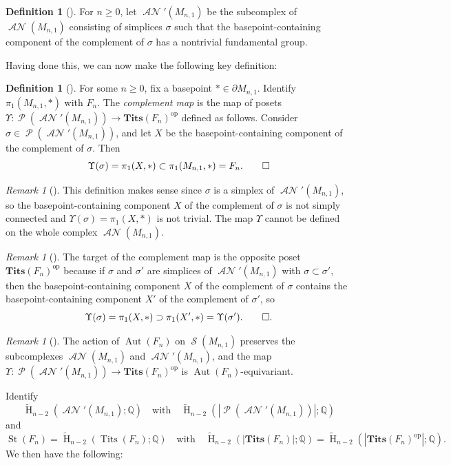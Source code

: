 \documentclass[11pt]{amsart}
\numberwithin{equation}{section}
\theoremstyle{plain}
\theoremstyle{definition}
\newtheorem{defn}[theorem]{Definition}
\newenvironment{definition}[1][]{\begin{defn}[#1]\pushQED{\qed}}{\popQED \end{defn}}
\theoremstyle{remark}
\newtheorem{rmk}[theorem]{Remark}
\newenvironment{remark}[1][]{\begin{rmk}[#1] \pushQED{\qed}}{\popQED \end{rmk}}
\newcommand\Q{\ensuremath{\mathbb{Q}}}
\DeclareMathOperator{\HH}{H}
\newcommand\RH{\ensuremath{\widetilde{\HH}}}
\DeclareMathOperator{\Aut}{Aut}
\newcommand\BTits{\ensuremath{\mathbf{Tits}  }}
\DeclareMathOperator{\Tits}{Tits}
\DeclareMathOperator{\St}{St}
\DeclareMathOperator{\Spheres}{\mathcal{S}}
\DeclareMathOperator{\ANSpheres}{\mathcal{AN}}
\DeclareMathOperator{\Poset}{\mathcal{P}}
\DeclareMathOperator{\opp}{op}
\begin{document}
\begin{definition}
For $n \geq 0$, let $\ANSpheres'(M_{n,1})$ be the subcomplex of $\ANSpheres(M_{n,1})$ consisting of
simplices $\sigma$ such that the basepoint-containing component of the
complement of $\sigma$ has a nontrivial fundamental group. 
\end{definition}

Having done this, we can now make the following key definition:

\begin{definition}
For some $n \geq 0$, fix a basepoint $\ast \in \partial M_{n,1}$.  Identify $\pi_1(M_{n,1},\ast)$ with $F_n$.
The {\em complement map} is the map of posets $\Upsilon\colon \Poset(\ANSpheres'(M_{n,1})) \rightarrow \BTits(F_n)^{\opp}$
defined as follows.  Consider $\sigma \in \Poset(\ANSpheres'(M_{n,1}))$, and let $X$ be the basepoint-containing
component of the complement of $\sigma$.  Then
\[\Upsilon(\sigma) = \pi_1(X,\ast) \subset \pi_1(M_{n,1},\ast) = F_n.\qedhere\]
\end{definition}

\begin{remark}
This definition makes sense since $\sigma$ is a simplex of $\ANSpheres'(M_{n,1})$, so the basepoint-containing
component $X$ of the complement of $\sigma$ is not simply connected and $\Upsilon(\sigma) = \pi_1(X,\ast)$ is
not trivial.  The map $\Upsilon$ cannot be defined on the whole complex $\ANSpheres(M_{n,1})$.
\end{remark}

\begin{remark}
The target of the complement map is the opposite poset $\BTits(F_n)^{\opp}$ because if $\sigma$ and $\sigma'$
are simplices of $\ANSpheres'(M_{n,1})$ with $\sigma \subset \sigma'$, then the basepoint-containing 
component $X$ of the complement of $\sigma$ contains the basepoint-containing component $X'$ of the complement
of $\sigma'$, so
\[\Upsilon(\sigma) = \pi_1(X,\ast) \supset \pi_1(X',\ast) = \Upsilon(\sigma').\qedhere.\]
\end{remark}

\begin{remark}
\label{remark:equivariance1}
The action of $\Aut(F_n)$ on $\Spheres(M_{n,1})$ preserves the subcomplexes $\ANSpheres(M_{n,1})$ and
$\ANSpheres'(M_{n,1})$, and the map $\Upsilon\colon \Poset(\ANSpheres'(M_{n,1})) \rightarrow \BTits(F_n)^{\opp}$
is $\Aut(F_n)$-equivariant.
\end{remark}

Identify 
\[\RH_{n-2}(\ANSpheres'(M_{n,1});\Q) \quad \text{with} \quad \RH_{n-2}(|\Poset(\ANSpheres'(M_{n,1}))|;\Q)\]
and
\[\St(F_n) = \RH_{n-2}(\Tits(F_n);\Q) \quad \text{with} \quad \RH_{n-2}(|\BTits(F_n)|;\Q) = \RH_{n-2}(|\BTits(F_n)^{\opp}|;\Q).\]  
We then have the following:
\end{document}

